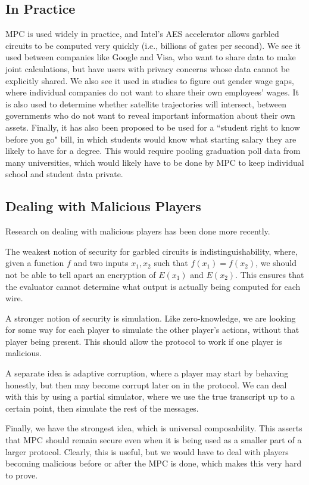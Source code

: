 \documentclass[11pt]{article}
\begin{document}
\subsection{In Practice}
MPC is used widely in practice, and Intel's AES accelerator allows garbled circuits to be computed very quickly (i.e., billions of gates per second).
We see it used between companies like Google and Visa, who want to share data to make joint calculations, but have users with privacy concerns whose data cannot be explicitly shared.
We also see it used in studies to figure out gender wage gaps, where individual companies do not want to share their own employees' wages.
It is also used to determine whether satellite trajectories will intersect, between governments who do not want to reveal important information about their own assets.
Finally, it has also been proposed to be used for a ``student right to know before you go" bill, in which students would know what starting salary they are likely to have for a degree. This would require pooling graduation poll data from many universities, which would likely have to be done by MPC to keep individual school and student data private.

\subsection{Dealing with Malicious Players}
Research on dealing with malicious players has been done more recently.

The weakest notion of security for garbled circuits is indistinguishability, where, given a function \(f\) and two inputs \(x_1,x_2\) such that \(f(x_1)=f(x_2)\), we should not be able to tell apart an encryption of \(E(x_1)\) and \(E(x_2)\). This ensures that the evaluator cannot determine what output is actually being computed for each wire.\medskip

A stronger notion of security is simulation. Like zero-knowledge, we are looking for some way for each player to simulate the other player's actions, without that player being present. This should allow the protocol to work if one player is malicious.\medskip

A separate idea is adaptive corruption, where a player may start by behaving honestly, but then may become corrupt later on in the protocol. We can deal with this by using a partial simulator, where we use the true transcript up to a certain point, then simulate the rest of the messages.\medskip

Finally, we have the strongest idea, which is universal composability. This asserts that MPC should remain secure even when it is being used as a smaller part of a larger protocol. Clearly, this is useful, but we would have to deal with players becoming malicious before or after the MPC is done, which makes this very hard to prove.\medskip
\end{document}
